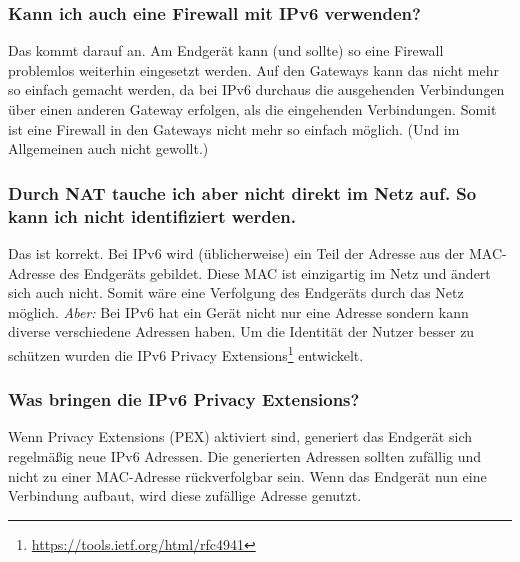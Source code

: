 \documentclass[10pt,a4paper,oneside]{scrartcl}
\begin{document}
\subsubsection*{Kann ich auch eine Firewall mit IPv6 verwenden?}
Das kommt darauf an. Am Endgerät kann (und sollte) so eine Firewall problemlos
weiterhin eingesetzt werden.
Auf den Gateways kann das nicht mehr so einfach gemacht werden, da bei IPv6
durchaus die ausgehenden Verbindungen über einen anderen Gateway erfolgen,
als die eingehenden Verbindungen. Somit ist eine Firewall in den Gateways
nicht mehr so einfach möglich. (Und im Allgemeinen auch nicht gewollt.)

\subsubsection*{Durch NAT tauche ich aber nicht direkt im Netz auf. So kann ich nicht identifiziert werden.}
Das ist korrekt. Bei IPv6 wird (üblicherweise) ein Teil der Adresse aus der MAC-Adresse des Endgeräts gebildet. Diese MAC ist einzigartig im Netz und ändert sich auch nicht. Somit wäre eine Verfolgung des Endgeräts durch das Netz möglich.
\emph{Aber: }Bei IPv6 hat ein Gerät nicht nur eine Adresse sondern kann diverse verschiedene Adressen haben.
Um die Identität der Nutzer besser zu schützen wurden die IPv6 Privacy Extensions\footnote{\url{https://tools.ietf.org/html/rfc4941}} entwickelt.

\subsubsection*{Was bringen die IPv6 Privacy Extensions?}
Wenn Privacy Extensions (PEX) aktiviert sind, generiert das Endgerät sich regelmäßig
neue IPv6 Adressen. Die generierten Adressen sollten zufällig und nicht zu einer MAC-Adresse rückverfolgbar sein. Wenn das Endgerät nun eine Verbindung aufbaut, wird diese zufällige Adresse genutzt.
\end{document}
